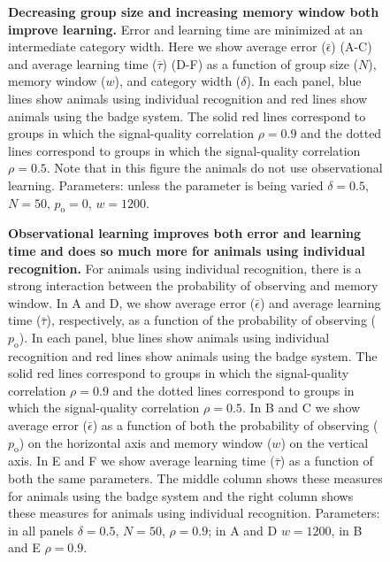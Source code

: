 \begin{figure}
\caption{\sffamily\small\textbf{Decreasing group size and increasing memory window both improve learning.} Error and learning time are minimized at an intermediate category width. Here we show average error ($\bar{\epsilon}$) (A-C) and average learning time ($\bar{\tau}$) (D-F) as a function of group size ($N$), memory window ($w$), and category width ($\delta$). In each panel, blue lines show animals using individual recognition and red lines show animals using the badge system. The solid red lines correspond to groups in which the signal-quality correlation $\rho=0.9$ and the dotted lines correspond to groups in which the signal-quality correlation $\rho=0.5$. Note that in this figure the animals do not use observational learning. Parameters: unless the parameter is being varied $\delta = 0.5$, $N=50$, $p_\text{o}=0$, $w=1200$.}
\label{parameters}
\end{figure}

\begin{figure}
\caption{\sffamily\small\textbf{Observational learning improves both error and learning time and does so much more for animals using individual recognition.} For animals using individual recognition, there is a strong interaction between the probability of observing and memory window. In A and D, we show average error ($\bar{\epsilon}$) and average learning time ($\bar{\tau}$), respectively, as a function of the probability of observing ($p_\text{o}$). In each panel, blue lines show animals using individual recognition and red lines show animals using the badge system. The solid red lines correspond to groups in which the signal-quality correlation $\rho=0.9$ and the dotted lines correspond to groups in which the signal-quality correlation $\rho=0.5$. In B and C we show average error ($\bar{\epsilon}$) as a function of both the probability of observing ($p_\text{o}$) on the horizontal axis and memory window ($w$) on the vertical axis. In E and F we show average learning time ($\bar{\tau}$) as a function of both the same parameters. The middle column shows these measures for animals using the badge system and the right column shows these measures for animals using individual recognition. Parameters: in all panels $\delta = 0.5$, $N=50$, $\rho=0.9$; in A and D $w=1200$, in B and E $\rho=0.9$.}
\label{observational}
\end{figure}

